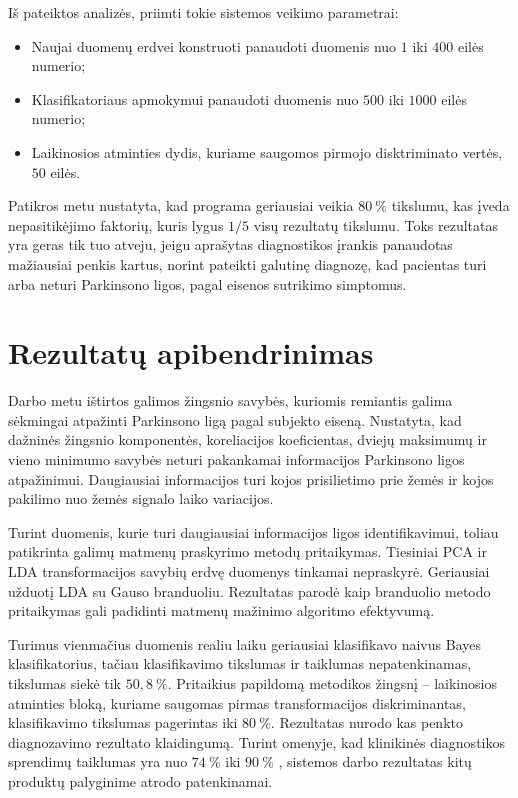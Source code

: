 \documentclass[]{vgtuef}
\begin{document}
Iš pateiktos analizės, priimti tokie sistemos veikimo parametrai:
\begin{itemize}
\item Naujai duomenų erdvei konstruoti panaudoti duomenis nuo $1$ iki $400$ eilės numerio;
\item Klasifikatoriaus apmokymui panaudoti duomenis nuo $500$ iki $1000$ eilės numerio;
\item Laikinosios atminties dydis, kuriame saugomos pirmojo disktriminato vertės, $50$ eilės.
\end{itemize}

Patikros metu nustatyta, kad programa geriausiai veikia $80~\%$ tikslumu, kas įveda nepasitikėjimo faktorių, kuris lygus $1/5$ visų rezultatų tikslumu. Toks rezultatas yra geras tik tuo atveju, jeigu aprašytas diagnostikos įrankis panaudotas mažiausiai penkis kartus, norint pateikti galutinę diagnozę, kad pacientas turi arba neturi Parkinsono ligos, pagal eisenos sutrikimo simptomus.

\section{Rezultatų apibendrinimas}


Darbo metu ištirtos galimos žingsnio savybės, kuriomis remiantis galima sėkmingai atpažinti Parkinsono ligą pagal subjekto eiseną. Nustatyta, kad dažninės žingsnio komponentės, koreliacijos koeficientas, dviejų maksimumų ir vieno minimumo savybės neturi pakankamai informacijos Parkinsono ligos atpažinimui. Daugiausiai informacijos turi kojos prisilietimo prie žemės ir kojos pakilimo nuo žemės signalo laiko variacijos.

Turint duomenis, kurie turi daugiausiai informacijos ligos identifikavimui, toliau patikrinta galimų matmenų praskyrimo metodų pritaikymas. Tiesiniai PCA ir LDA transformacijos savybių erdvę duomenys tinkamai nepraskyrė. Geriausiai užduotį LDA su Gauso branduoliu. Rezultatas parodė kaip branduolio metodo pritaikymas gali padidinti matmenų mažinimo algoritmo efektyvumą.

Turimus vienmačius duomenis realiu laiku geriausiai klasifikavo naivus Bayes klasifikatorius, tačiau klasifikavimo tikslumas ir taiklumas nepatenkinamas, tikslumas siekė tik $50,8~\%$. Pritaikius papildomą metodikos žingsnį -- laikinosios atminties bloką, kuriame saugomas pirmas transformacijos diskriminantas, klasifikavimo tikslumas pagerintas iki $80~\%$. Rezultatas nurodo kas penkto diagnozavimo rezultato klaidingumą. Turint omenyje, kad klinikinės diagnostikos sprendimų taiklumas yra nuo $74~\%$ iki $90~\%$ \cite{vgtu}, sistemos darbo rezultatas kitų produktų palyginime atrodo patenkinamai.
\end{document}
